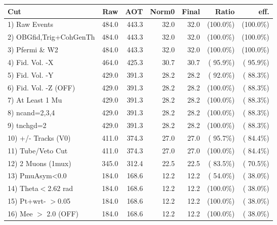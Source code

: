 \begin{table}[h!]\centering
 \begin{tabular}{||l||r|r|r|r|r|r||}
 \hline
 \hline
 Cut & Raw & AOT & Norm0 & Final & Ratio & eff.       \\
 \hline
  1) Raw Events           &        484.0 &        443.3 &         32.0 &         32.0 & (100.0\%) & (100.0\%) \\
  2) OBGfid,Trig+CohGenTh &        484.0 &        443.3 &         32.0 &         32.0 & (100.0\%) & (100.0\%) \\
  3) Pfermi \& W2         &        484.0 &        443.3 &         32.0 &         32.0 & (100.0\%) & (100.0\%) \\
  4) Fid. Vol. -X         &        464.0 &        425.3 &         30.7 &         30.7 & ( 95.9\%) & ( 95.9\%) \\
  5) Fid. Vol. -Y         &        429.0 &        391.3 &         28.2 &         28.2 & ( 92.0\%) & ( 88.3\%) \\
  6) Fid. Vol. -Z (OFF)   &        429.0 &        391.3 &         28.2 &         28.2 & (100.0\%) & ( 88.3\%) \\
  7) At Least 1 Mu        &        429.0 &        391.3 &         28.2 &         28.2 & (100.0\%) & ( 88.3\%) \\
  8) ncand=2,3,4          &        429.0 &        391.3 &         28.2 &         28.2 & (100.0\%) & ( 88.3\%) \\
  9) tnchgd=2             &        429.0 &        391.3 &         28.2 &         28.2 & (100.0\%) & ( 88.3\%) \\
 10) +/- Tracks (V0)      &        411.0 &        374.3 &         27.0 &         27.0 & ( 95.7\%) & ( 84.4\%) \\
 11) Tube/Veto Cut        &        411.0 &        374.3 &         27.0 &         27.0 & (100.0\%) & ( 84.4\%) \\
 12) 2 Muons (1mux)       &        345.0 &        312.4 &         22.5 &         22.5 & ( 83.5\%) & ( 70.5\%) \\
 13) PmuAsym<0.0          &        184.0 &        168.6 &         12.2 &         12.2 & ( 54.0\%) & ( 38.0\%) \\
 14) Theta$<$2.62 rad     &        184.0 &        168.6 &         12.2 &         12.2 & (100.0\%) & ( 38.0\%) \\
 15) Pt+wrt- $>$0.05      &        184.0 &        168.6 &         12.2 &         12.2 & (100.0\%) & ( 38.0\%) \\
 16) Mee $>$ 2.0  (OFF)   &        184.0 &        168.6 &         12.2 &         12.2 & (100.0\%) & ( 38.0\%) \\

\end{tabular}
\end{table}
